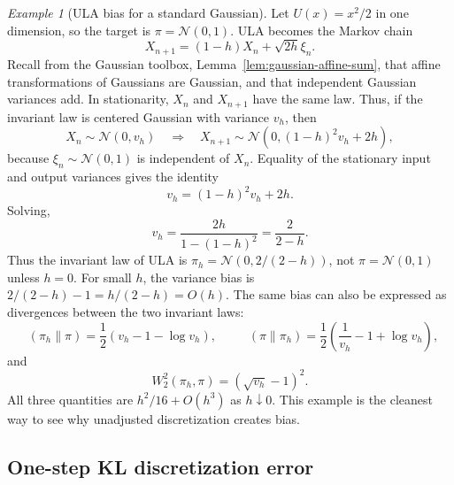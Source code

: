 \documentclass{amsart}
\numberwithin{equation}{section}
\theoremstyle{plain}
\theoremstyle{definition}
\theoremstyle{remark}
\newtheorem*{example}{Example}
\DeclareMathOperator{\KL}{D_{\mathsf{KL}}}
\newcommand{\normal}[2]{\mathcal{N}\!\left(#1,#2\right)}
\begin{document}
\begin{example}[ULA bias for a standard Gaussian]
Let $U(x)=x^2/2$ in one dimension, so the target is $\pi=\normal{0}{1}$.
ULA becomes the Markov chain
\[
    X_{n+1}=(1-h)X_n+\sqrt{2h}\xi_n.
\]
Recall from the Gaussian toolbox, Lemma~\ref{lem:gaussian-affine-sum}, that
affine transformations of Gaussians are Gaussian, and that independent Gaussian
variances add.  In stationarity, $X_n$ and $X_{n+1}$ have the same law.  Thus,
if the invariant law is centered Gaussian with variance $v_h$, then
\[
    X_n\sim\normal{0}{v_h}
    \quad\Longrightarrow\quad
    X_{n+1}\sim
    \normal{0}{(1-h)^2v_h+2h},
\]
because $\xi_n\sim\normal{0}{1}$ is independent of $X_n$.  Equality of the
stationary input and output variances gives the identity
\[
    v_h=(1-h)^2v_h+2h.
\]
Solving,
\[
    v_h=\frac{2h}{1-(1-h)^2}=\frac{2}{2-h}.
\]
Thus the invariant law of ULA is $\pi_h=\normal{0}{2/(2-h)}$, not $\pi=\normal{0}{1}$ unless $h=0$.  For small $h$, the variance bias is $2/(2-h)-1=h/(2-h)=O(h)$.  The same bias can also be expressed as divergences between the two invariant laws:
\[
    \KL(\pi_h\|\pi)
    =
    \frac12\left(v_h-1-\log v_h\right),
    \qquad
    \KL(\pi\|\pi_h)
    =
    \frac12\left(\frac1{v_h}-1+\log v_h\right),
\]
and
\[
    W_2^2(\pi_h,\pi)=(\sqrt{v_h}-1)^2.
\]
All three quantities are $h^2/16+O(h^3)$ as $h\downarrow0$.  This example is
the cleanest way to see why unadjusted discretization creates bias.
\end{example}

\subsection{One-step KL discretization error}
\end{document}
